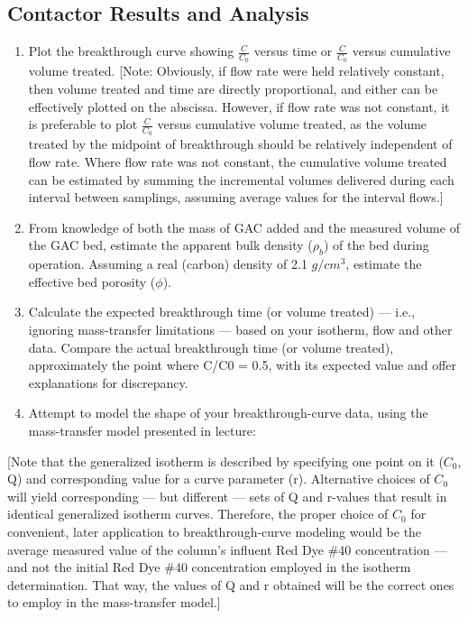 \documentclass[letterpaper,10pt,english]{sphinxmanual}
\begin{document}
\subsection{Contactor Results and Analysis}
\label{\detokenize{Adsorption/Adsorption:contactor-results-and-analysis}}\begin{enumerate}
\item {} 
Plot the breakthrough curve showing \(\frac{C}{C_0}\) versus time or \(\frac{C}{C_0}\) versus cumulative volume treated. {[}Note: Obviously, if flow rate were held relatively constant, then volume treated and time are directly proportional, and either can be effectively plotted on the abscissa. However, if flow rate was not constant, it is preferable to plot \(\frac{C}{C_0}\) versus cumulative volume treated, as the volume treated by the midpoint of breakthrough should be relatively independent of flow rate. Where flow rate was not constant, the cumulative volume treated can be estimated by summing the incremental volumes delivered during each interval between samplings, assuming average values for the interval flows.{]}

\item {} 
From knowledge of both the mass of GAC added and the measured volume of the GAC bed, estimate the apparent bulk density (\(\rho_b\)) of the bed during operation. Assuming a real (carbon) density of 2.1 \(g/cm^3\), estimate the effective bed porosity (\(\phi\)).

\item {} 
Calculate the expected breakthrough time (or volume treated) — i.e., ignoring mass-transfer limitations — based on your isotherm, flow and other data. Compare the actual breakthrough time (or volume treated), approximately the point where C/C0 = 0.5, with its expected value and offer explanations for discrepancy.

\item {} 
Attempt to model the shape of your breakthrough-curve data, using the mass-transfer model presented in lecture:

\end{enumerate}

{[}Note that the generalized isotherm is described by specifying one point on it (\(C_0\), Q) and corresponding value for a curve parameter (r). Alternative choices of \(C_0\) will yield corresponding — but different — sets of Q and r-values that result in identical generalized isotherm curves. Therefore, the proper choice of \(C_0\) for convenient, later application to breakthrough-curve modeling would be the average measured value of the column’s influent Red Dye \#40 concentration — and not the initial Red Dye \#40 concentration employed in the isotherm determination. That way, the values of Q and r obtained will be the correct ones to employ in the mass-transfer model.{]}
\end{document}
